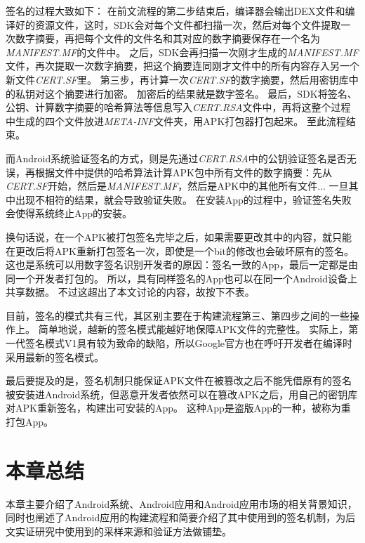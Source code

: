 签名的过程大致如下：
在前文流程的第二步结束后，编译器会输出DEX文件和编译好的资源文件，这时，SDK会对每个文件都扫描一次，然后对每个文件提取一次数字摘要，再把每个文件的文件名和其对应的数字摘要保存在一个名为\textit{MANIFEST.MF}的文件中。
之后，SDK会再扫描一次刚才生成的\textit{MANIFEST.MF}文件，再次提取一次数字摘要，把这个摘要连同刚才文件中的所有内容存入另一个新文件\textit{CERT.SF}里。
第三步，再计算一次\textit{CERT.SF}的数字摘要，然后用密钥库中的私钥对这个摘要进行加密。
加密后的结果就是数字签名。
最后，SDK将签名、公钥、计算数字摘要的哈希算法等信息写入\textit{CERT.RSA}文件中，再将这整个过程中生成的四个文件放进\textit{META-INF}文件夹，用APK打包器打包起来。
至此流程结束。

而Android系统验证签名的方式，则是先通过\textit{CERT.RSA}中的公钥验证签名是否无误，再根据文件中提供的哈希算法计算APK包中所有文件的数字摘要：先从\textit{CERT.SF}开始，然后是\textit{MANIFEST.MF}，然后是APK中的其他所有文件...
一旦其中出现不相符的结果，就会导致验证失败。
在安装App的过程中，验证签名失败会使得系统终止App的安装。

换句话说，在一个APK被打包签名完毕之后，如果需要更改其中的内容，就只能在更改后将APK重新打包签名一次，即使是一个bit的修改也会破坏原有的签名。
这也是系统可以用数字签名识别开发者的原因：签名一致的App，最后一定都是由同一个开发者打包的。
所以，具有同样签名的App也可以在同一个Android设备上共享数据。
不过这超出了本文讨论的内容，故按下不表。

目前，签名的模式共有三代，其区别主要在于构建流程第三、第四步之间的一些操作上。
简单地说，越新的签名模式能越好地保障APK文件的完整性。
实际上，第一代签名模式V1具有较为致命的缺陷，所以Google官方也在呼吁开发者在编译时采用最新的签名模式。

最后要提及的是，签名机制只能保证APK文件在被篡改之后不能凭借原有的签名被安装进Android系统，但恶意开发者依然可以在篡改APK之后，用自己的密钥库对APK重新签名，构建出可安装的App。
这种App是盗版App的一种，被称为重打包App。

\section{本章总结}

本章主要介绍了Android系统、Android应用和Android应用市场的相关背景知识，同时也阐述了Android应用的构建流程和简要介绍了其中使用到的签名机制，为后文实证研究中使用到的采样来源和验证方法做铺垫。
